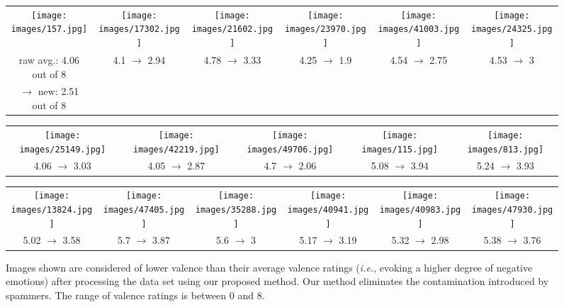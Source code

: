 \documentclass[10pt,journal,letterpaper,compsoc,twoside]{IEEEtran}
\begin{document}
\begin{figure*}[ht!]
\centering
\begin{tabular}{cccccc}
\texttt{[image: images/157.jpg]} &
\texttt{[image: images/17302.jpg]} &
\texttt{[image: images/21602.jpg]} &
\texttt{[image: images/23970.jpg]} &
\texttt{[image: images/41003.jpg]}&
\texttt{[image: images/24325.jpg]}\\[-0.2cm]
\small raw avg.: 4.06 out of 8 &
4.1 $\rightarrow$ 2.94 &
4.78 $\rightarrow$ 3.33 &
4.25 $\rightarrow$ 1.9 &
4.54 $\rightarrow$ 2.75 &
4.53 $\rightarrow$ 3\\[-0.2cm]
$\rightarrow$ new: 2.51 out of 8  & &&&\\
\end{tabular}
\begin{tabular}{ccccc}
\texttt{[image: images/25149.jpg]} &
\texttt{[image: images/42219.jpg]} &
\texttt{[image: images/49706.jpg]} &
\texttt{[image: images/115.jpg]} &
\texttt{[image: images/813.jpg]}\\[-0.2cm]
\small 4.06 $\rightarrow$ 3.03 &
4.05 $\rightarrow$ 2.87 &
4.7 $\rightarrow$ 2.06 &
5.08 $\rightarrow$ 3.94 &
5.24 $\rightarrow$ 3.93
\end{tabular}
\begin{tabular}{cccccc}
\texttt{[image: images/13824.jpg]} &
\texttt{[image: images/47405.jpg]} &
\texttt{[image: images/35288.jpg]} &
\texttt{[image: images/40941.jpg]} &
\texttt{[image: images/40983.jpg]} &
\texttt{[image: images/47930.jpg]}\\[-0.2cm]
\small
5.02 $\rightarrow$ 3.58 &
5.7 $\rightarrow$ 3.87 &
5.6 $\rightarrow$ 3 &
5.17 $\rightarrow$ 3.19 &
5.32 $\rightarrow$ 2.98 &
5.38 $\rightarrow$ 3.76
\end{tabular}
\caption{Images shown are considered of lower valence 
than their average valence ratings 
({\it i.e.}, evoking a higher degree of negative emotions) 
after processing the data set using our proposed method. 
Our method eliminates the contamination introduced by spammers. The range of valence ratings is between 0 and 8.}
\label{fig:example}
\end{figure*}
\end{document}
